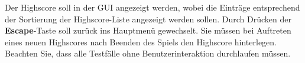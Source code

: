 Der Highscore soll in der GUI angezeigt werden, wobei die
Eintr\"age entsprechend der Sortierung der Highscore-Liste angezeigt
werden sollen. Durch Drücken der \textbf{Escape}-Taste soll zurück ins Hauptmenü gewechselt.
Sie m\"ussen bei Auftreten eines neuen Highscores
nach Beenden des Spiels den Highscore hinterlegen.
Beachten Sie, dass alle Testf\"alle ohne Benutzerinteraktion
durchlaufen m\"ussen.
